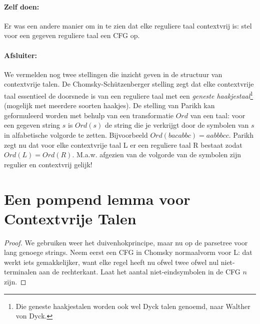 \paragraph{Zelf doen:} 
Er was een andere manier om in te zien dat elke reguliere taal
contextvrij is: stel voor een gegeven reguliere taal een CFG op.

\paragraph{Afsluiter:} We vermelden nog twee stellingen die inzicht
geven in de structuur van contextvrije talen. De
Chomsky-Sch\"{u}tzenberger stelling zegt dat elke contextvrije taal
essentieel de doorsnede is van een reguliere taal met een {\em geneste
haakjestaal}\footnote{Die geneste haakjestalen worden ook wel Dyck
talen genoemd, naar Walther von Dyck.} (mogelijk met meerdere soorten
haakjes). De stelling van Parikh kan geformuleerd worden met behulp
van een transformatie $Ord$ van een taal: voor een gegeven string $s$
is $Ord(s)$ de string die je verkrijgt door de symbolen van $s$ in
alfabetische volgorde te zetten. Bijvoorbeeld $Ord(bacabbc) =
aabbbcc$. Parikh zegt nu dat voor elke contextvrije taal L er een
reguliere taal R bestaat zodat $Ord(L) = Ord(R)$. M.a.w. afgezien van
de volgorde van de symbolen zijn regulier en contextvrij gelijk!


\clearpage
\section{Een pompend lemma voor Contextvrije Talen}\label{pompcfl}

\begin{proof}
We gebruiken weer het duivenhokprincipe, maar nu op de parsetree voor
lang genoege strings. Neem eerst een CFG in Chomsky normaalvorm voor
L: dat werkt iets gemakkelijker, want elke regel heeft nu ofwel twee
ofwel nul niet-terminalen aan de rechterkant. Laat het aantal
niet-eindsymbolen in de CFG $n$ zijn.
\end{proof}


